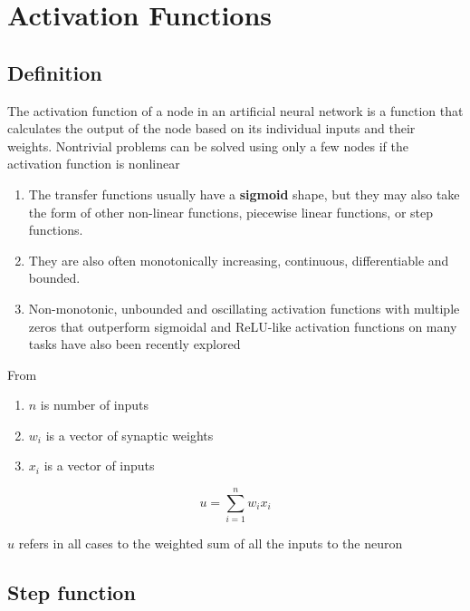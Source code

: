 \chapter{Activation Functions}\label{chapter: Activation Functions}

\section{Definition \cite{wiki-Artificial_neuron, wiki-activation-fn}}

The activation function of a node in an artificial neural network is a function that calculates the output of the node based on its individual inputs and their weights. Nontrivial problems can be solved using only a few nodes if the activation function is nonlinear

\vspace{0.2cm}
\begin{enumerate}
    \item  The transfer functions usually have a \textbf{sigmoid} shape, but they may also take the form of other non-linear functions, piecewise linear functions, or step functions.
    \item They are also often monotonically increasing, continuous, differentiable and bounded. 
    \item  Non-monotonic, unbounded and oscillating activation functions with multiple zeros that outperform sigmoidal and ReLU-like activation functions on many tasks have also been recently explored
\end{enumerate}

\vspace{0.2cm}
\noindent From \cite{wiki-Artificial_neuron} \\

\begin{enumerate}
    \item $n$ is number of inputs
    \item $w_i$ is a vector of synaptic weights
    \item $x_i$ is a vector of inputs
\end{enumerate}
\[
    u=\sum _{i=1}^{n}w_{i}x_{i}
\]

$u$ refers in all cases to the weighted sum of all the inputs to the neuron

\section{Step function \cite{wiki-Artificial_neuron}}\label{Step function}

